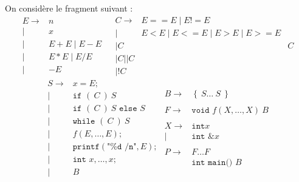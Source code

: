\documentclass{cours}
\begin{document}
On considère le fragment suivant :
\[
    \begin{aligned}
        E \rightarrow & n                & \\
        \mid          & x                & \\
        \mid          & E + E \mid E - E   \\
        \mid          & E * E \mid E/E     \\
        \mid          & - E
    \end{aligned}
    \begin{aligned}
        C \rightarrow & E == E \mid E!= E                         \\
        \mid          & E<E \mid E<= E \mid E > E \mid E >= E     \\
        \mid C        &                                       & C \\
        \mid C || C                                               \\
        \mid !C
    \end{aligned}
\]
\[
    \begin{aligned}
        S \rightarrow & x = E;                                    \\
        \mid          & \texttt{if } (\ C\ )\ S                   \\
        \mid          & \texttt{if } (\ C\ )\ S \texttt{ else } S \\
        \mid          & \texttt{while } (\ C\ )\ S                \\
        \mid          & f(E, \ldots, E);                          \\
        \mid          & \texttt{printf}(\texttt{"\%d /n"}, E);    \\
        \mid          & \texttt{int } x, \ldots, x;               \\
        \mid          & B
    \end{aligned}
    \begin{aligned}
        B \rightarrow & \left\{\ S \ldots\ S\ \right\}     \\
                      &                                    \\
        F \rightarrow & \texttt{void } f(X, \ldots, X) \ B \\
                      &                                    \\
        X \rightarrow & \texttt{int} x                     \\
        \mid          & \texttt{int } \texttt{\&}x         \\
                      &                                    \\
        P \rightarrow & F \ldots F                         \\
                      & \texttt{int main() } B
    \end{aligned}
\]
\end{document}

